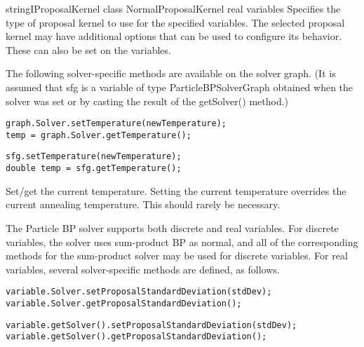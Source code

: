 
{\ifmatlab string\fi \ifjava IProposalKernel class\fi}
{NormalProposalKernel}
{real variables}
{Specifies the type of proposal kernel to use for the specified variables. The selected proposal kernel may have additional options that can be used to configure its behavior. These can also be set on the variables.}


The following solver-specific methods are available on the solver graph. \ifjava (It is assumed that sfg is a variable of type ParticleBPSolverGraph obtained when the solver was set or by casting the result of the getSolver() method.)\fi

\ifmatlab
\begin{lstlisting}
graph.Solver.setTemperature(newTemperature);
temp = graph.Solver.getTemperature();
\end{lstlisting}
\fi

\ifjava
\begin{lstlisting}
sfg.setTemperature(newTemperature);
double temp = sfg.getTemperature();
\end{lstlisting}
\fi

Set/get the current temperature. Setting the current temperature overrides the current annealing temperature. This should rarely be necessary.


The Particle BP solver supports both discrete and real variables. For discrete variables, the solver uses sum-product BP as normal, and all of the corresponding methods for the sum-product solver may be used for discrete variables. For real variables, several solver-specific methods are defined, as follows.

\label{sec:ParticleBPRealVariableSpecificMethods}

\ifmatlab
\begin{lstlisting}
variable.Solver.setProposalStandardDeviation(stdDev);
variable.Solver.getProposalStandardDeviation();
\end{lstlisting}
\fi

\ifjava
\begin{lstlisting}
variable.getSolver().setProposalStandardDeviation(stdDev);
variable.getSolver().getProposalStandardDeviation();
\end{lstlisting}
\fi


